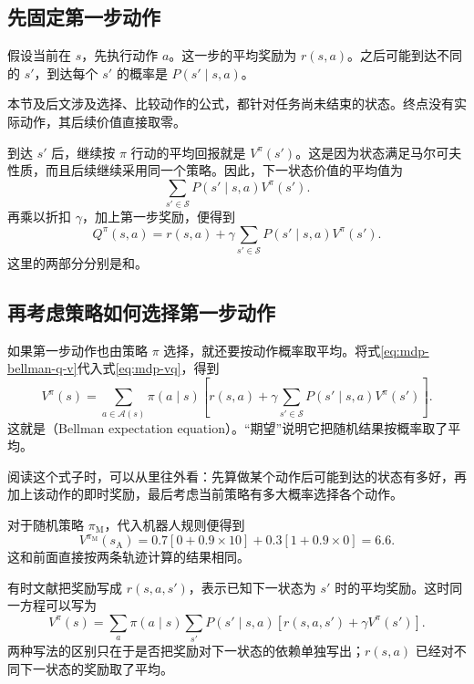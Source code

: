 \documentclass[UTF8]{ctexart}
\begin{document}
\subsection{先固定第一步动作}

假设当前在 $s$，先执行动作 $a$。这一步的平均奖励为 $r(s,a)$。之后可能到达不同的 $s'$，到达每个 $s'$ 的概率是 $P(s'\mid s,a)$。

本节及后文涉及选择、比较动作的公式，都针对任务尚未结束的状态。终点没有实际动作，其后续价值直接取零。

到达 $s'$ 后，继续按 $\pi$ 行动的平均回报就是 $V^\pi(s')$。这是因为状态满足马尔可夫性质，而且后续继续采用同一个策略。因此，下一状态价值的平均值为
\[
  \sum_{s'\in\mathcal S}P(s'\mid s,a)V^\pi(s').
\]
再乘以折扣 $\gamma$，加上第一步奖励，便得到
\begin{equation}
  Q^\pi(s,a)
  =r(s,a)+\gamma\sum_{s'\in\mathcal S}P(s'\mid s,a)V^\pi(s').
  \label{eq:mdp-bellman-q-v}
\end{equation}
这里的两部分分别是和。

\subsection{再考虑策略如何选择第一步动作}

如果第一步动作也由策略 $\pi$ 选择，就还要按动作概率取平均。将式\eqref{eq:mdp-bellman-q-v}代入式\eqref{eq:mdp-vq}，得到
\begin{equation}
  V^\pi(s)=\sum_{a\in\mathcal A(s)}\pi(a\mid s)
  \left[r(s,a)+\gamma\sum_{s'\in\mathcal S}P(s'\mid s,a)V^\pi(s')\right].
  \label{eq:mdp-bellman-v}
\end{equation}
这就是（Bellman expectation equation）。“期望”说明它把随机结果按概率取了平均。

阅读这个式子时，可以从里往外看：先算做某个动作后可能到达的状态有多好，再加上该动作的即时奖励，最后考虑当前策略有多大概率选择各个动作。

对于随机策略 $\pi_{\mathrm M}$，代入机器人规则便得到
\[
  V^{\pi_{\mathrm M}}(s_{\mathrm A})
  =0.7[0+0.9\times10]+0.3[1+0.9\times0]
  =6.6.
\]
这和前面直接按两条轨迹计算的结果相同。

有时文献把奖励写成 $r(s,a,s')$，表示已知下一状态为 $s'$ 时的平均奖励。这时同一方程可以写为
\[
  V^\pi(s)=\sum_a\pi(a\mid s)\sum_{s'}P(s'\mid s,a)
  [r(s,a,s')+\gamma V^\pi(s')].
\]
两种写法的区别只在于是否把奖励对下一状态的依赖单独写出；$r(s,a)$ 已经对不同下一状态的奖励取了平均。
\end{document}
